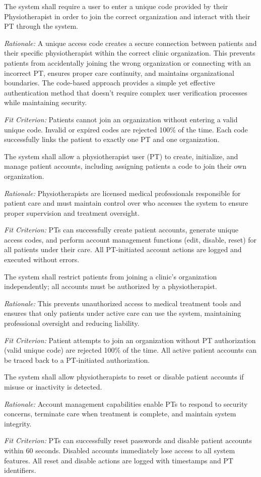 \documentclass[12pt]{article}
\newcommand{\rationale}[1]{\par\emph{Rationale:} #1}
\newcommand{\fitcrit}[1]{\par\emph{Fit Criterion:} #1}
\begin{document}
\begin{reqlist}
	\item[FR 1.3] The system shall require a user to enter a unique code provided by their Physiotherapist in order to join the correct organization and interact with their PT through the system.
	\rationale{A unique access code creates a secure connection between patients and their specific physiotherapist within the correct clinic organization. This prevents patients from accidentally joining the wrong organization or connecting with an incorrect PT, ensures proper care continuity, and maintains organizational boundaries. The code-based approach provides a simple yet effective authentication method that doesn't require complex user verification processes while maintaining security.}
	\fitcrit{Patients cannot join an organization without entering a valid unique code. Invalid or expired codes are rejected 100\% of the time. Each code successfully links the patient to exactly one PT and one organization.}
	
	\item[FR 2.] The system shall allow a physiotherapist user (PT) to create, initialize, and manage patient accounts, including assigning patients a code to join their own organization.
	\rationale{Physiotherapists are licensed medical professionals responsible for patient care and must maintain control over who accesses the system to ensure proper supervision and treatment oversight.}
	\fitcrit{PTs can successfully create patient accounts, generate unique access codes, and perform account management functions (edit, disable, reset) for all patients under their care. All PT-initiated account actions are logged and executed without errors.}
	
	\item[FR 3.] The system shall restrict patients from joining a clinic’s organization independently; all accounts must be authorized by a physiotherapist.
	\rationale{This prevents unauthorized access to medical treatment tools and ensures that only patients under active care can use the system, maintaining professional oversight and reducing liability.}
	\fitcrit{Patient attempts to join an organization without PT authorization (valid unique code) are rejected 100\% of the time. All active patient accounts can be traced back to a PT-initiated authorization.}
	
	\item[FR 4.] The system shall allow physiotherapists to reset or disable patient accounts if misuse or inactivity is detected.
	\rationale{Account management capabilities enable PTs to respond to security concerns, terminate care when treatment is complete, and maintain system integrity.}
	\fitcrit{PTs can successfully reset passwords and disable patient accounts within 60 seconds. Disabled accounts immediately lose access to all system features. All reset and disable actions are logged with timestamps and PT identifiers.}
	

\end{reqlist}
\end{document}
